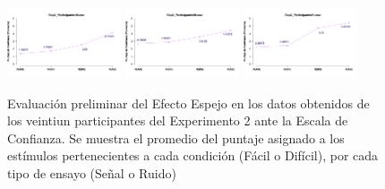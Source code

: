 \begin{figure}[th]
\includegraphics[width=0.30\textwidth]{Figures/MirrorRating_Exp2_P19} \includegraphics[width=0.30\textwidth]{Figures/MirrorRating_Exp2_P20} \includegraphics[width=0.30\textwidth]{Figures/MirrorRating_Exp2_P21} 
\caption[Puntaje de confianza promedio por tipo de estímulo (A-B) y tipo de ensayo (S-N); Experimento 2]{Evaluación preliminar del Efecto Espejo en los datos obtenidos de los veintiun participantes del Experimento 2 ante la Escala de Confianza. Se muestra el promedio del puntaje asignado a los estímulos pertenecientes a cada condición (Fácil o Difícil), por cada tipo de ensayo (Señal o Ruido)}
\label{fig:MERating_E2}
\end{figure}




